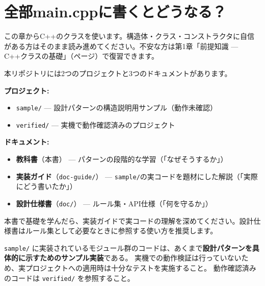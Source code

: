 \section{全部main.cppに書くとどうなる？}

\begin{notebox}[C++クラスの復習が必要な方へ]
この章からC++のクラスを使います。構造体・クラス・コンストラクタに自信がある方はそのまま読み進めてください。不安な方は第1章「前提知識 — C++クラスの基礎」（\pageref{sec:prerequisite}ページ）で復習できます。
\end{notebox}

\begin{notebox}[関連ドキュメントとプロジェクト構成]
本リポジトリには2つのプロジェクトと3つのドキュメントがあります。

\textbf{プロジェクト:}
\begin{itemize}
  \item \texttt{sample/} — 設計パターンの構造説明用サンプル（動作未確認）
  \item \texttt{verified/} — 実機で動作確認済みのプロジェクト
\end{itemize}

\textbf{ドキュメント:}
\begin{itemize}
  \item \textbf{教科書}（本書） — パターンの段階的な学習（「なぜそうするか」）
  \item \textbf{実装ガイド}（\texttt{doc-guide/}） — \texttt{sample/}の実コードを題材にした解説（「実際にどう書いたか」）
  \item \textbf{設計仕様書}（\texttt{doc/}） — ルール集・API仕様（「何を守るか」）
\end{itemize}

本書で基礎を学んだら、実装ガイドで実コードの理解を深めてください。設計仕様書はルール集として必要なときに参照する使い方を推奨します。
\end{notebox}

\begin{cautionbox}[サンプルコードについて]
\texttt{sample/} に実装されているモジュール群のコードは、あくまで\textbf{設計パターンを具体的に示すためのサンプル実装}である。
実機での動作検証は行っていないため、実プロジェクトへの適用時は十分なテストを実施すること。
動作確認済みのコードは \texttt{verified/} を参照すること。
\end{cautionbox}

